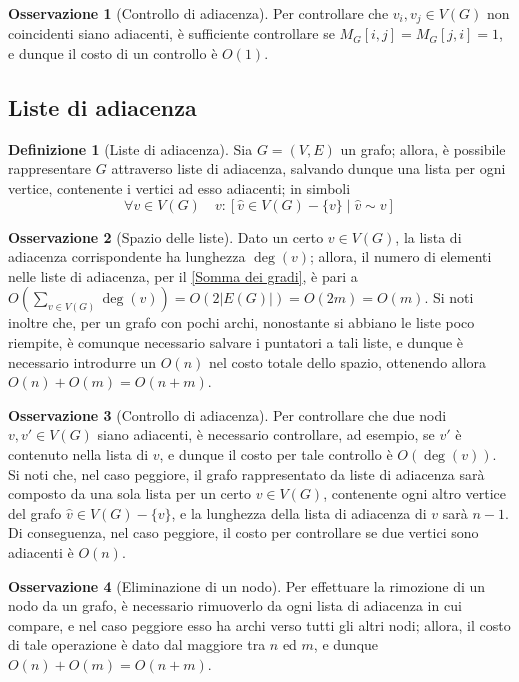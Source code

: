 \documentclass[14pt]{extreport}
\theoremstyle{definition}
\newtheorem{definition}{Definizione}[subsection]
\theoremstyle{definition}
\newtheorem{remark}{Osservazione}[subsection]
\begin{document}
\begin{remark}[Controllo di adiacenza]
    Per controllare che $v_i, v_j \in V(G)$ non coincidenti siano adiacenti, è sufficiente controllare se $M_G[i, j] = M_G[j, i] = 1$, e dunque il costo di un controllo è $O(1)$.
\end{remark}

\subsection{Liste di adiacenza}

\begin{definition}[Liste di adiacenza]
    Sia $G = (V, E)$ un grafo; allora, è possibile rappresentare $G$ attraverso liste di adiacenza, salvando dunque una lista per ogni vertice, contenente i vertici ad esso adiacenti; in simboli $$\forall v \in V(G) \quad v:[\hat{v} \in V(G) - \{v\} \mid \hat{v} \sim v]$$
\end{definition}

\begin{remark}[Spazio delle liste]
    Dato un certo $v \in V(G)$, la lista di adiacenza corrispondente ha lunghezza $\deg(v)$; allora, il numero di elementi nelle liste di adiacenza, per il \cref{Somma dei gradi}, è pari a $\displaystyle O \left(\sum_{v \in V(G)}{\deg(v)}\right) = O\left( 2 |E(G)| \right)=O(2m) = O(m)$. Si noti inoltre che, per un grafo con pochi archi, nonostante si abbiano le liste poco riempite, è comunque necessario salvare i puntatori a tali liste, e dunque è necessario introdurre un $O(n)$ nel costo totale dello spazio, ottenendo allora $O(n) + O(m) = O(n + m)$.
\end{remark}

\begin{remark}[Controllo di adiacenza]
    Per controllare che due nodi $v, v' \in V(G)$ siano adiacenti, è necessario controllare, ad esempio, se $v'$ è contenuto nella lista di $v$, e dunque il costo per tale controllo è $O(\deg(v))$.
    Si noti che, nel caso peggiore, il grafo rappresentato da liste di adiacenza sarà composto da una sola lista per un certo $v \in V(G)$, contenente ogni altro vertice del grafo $\hat{v} \in V(G) - \{v\}$, e la lunghezza della lista di adiacenza di $v$ sarà $n - 1$. Di conseguenza, nel caso peggiore, il costo per controllare se due vertici sono adiacenti è $O(n)$.
\end{remark}

\begin{remark}[Eliminazione di un nodo]
    Per effettuare la rimozione di un nodo da un grafo, è necessario rimuoverlo da ogni lista di adiacenza in cui compare, e nel caso peggiore esso ha archi verso tutti gli altri nodi; allora, il costo di tale operazione è dato dal maggiore tra $n$ ed $m$, e dunque $O(n) + O(m) = O(n + m)$.
\end{remark}
\end{document}
